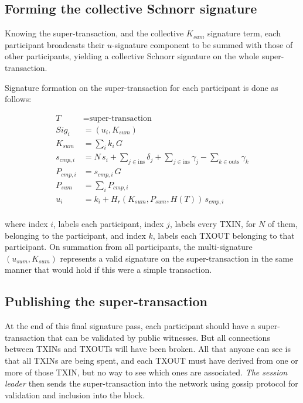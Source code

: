 \documentclass[8pt,fleqn,openany]{book}
\begin{document}
{\subsection{Forming the collective Schnorr signature} 
Knowing the super-transaction, and the collective $K_{sum}$ signature term, each participant broadcasts their $u$-signature component to be summed with those of other participants, yielding a collective Schnorr signature on the whole super-transaction.

Signature formation on the super-transaction for each participant is done as follows:

\begin{align*}
T &= \text{super-transaction} \\
Sig_i &= (u_i, K_{sum}) \\
K_{sum} &= \sum_i{k_i \, G} \\
s_{cmp,i} &= N \, s_i + \sum_{j \in \text{ins}} {\delta_j} + \sum_{j \in \text{ins}} {\gamma_j} - \sum_{k \in \text{outs}} {\gamma_k} \\
P_{cmp,i} &= s_{cmp,i} \, G \\
P_{sum} &= \sum_i{P_{cmp,i}}\\
u_i &= k_i + H_r(K_{sum} , P_{sum},  H(T)) \,  s_{cmp,i}\\
\end{align*}

where index $i$, labels each participant, index $j$, labels every TXIN, for $N$ of them, belonging to the participant, and index $k$, labels each TXOUT belonging to that participant. On summation from all participants, the multi-signature $(u_{sum}, K_{sum})$ represents a valid signature on the super-transaction in the same manner that would hold if this were a simple transaction.

\subsection{Publishing the super-transaction} 
At the end of this final signature pass, each participant should have a super-transaction that can be validated by public witnesses. But all connections between TXINs and TXOUTs will have been broken. All that anyone can see is that all TXINs are being spent, and each TXOUT must have derived from one or more of those TXIN, but no way to see which ones are associated. \textit{The session leader} then sends the super-transaction into the network using gossip protocol for validation and inclusion into the block.

}
\end{document}

